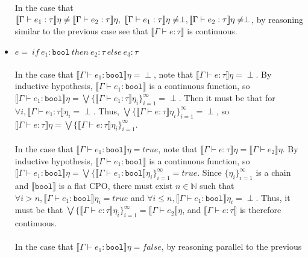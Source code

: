 \documentclass{westhesis}
\begin{document}
\begin{itemize}
 In the case that $\llbracket \Gamma \vdash e_1 : \tau \rrbracket\eta \neq \llbracket \Gamma \vdash e_2 : \tau\rrbracket\eta, \ \llbracket \Gamma \vdash e_1 : \tau \rrbracket\eta \neq \perp, \\ \llbracket \Gamma \vdash e_2 : \tau \rrbracket\eta \neq \perp$, by reasoning similar to the previous case see that $\llbracket \Gamma \vdash e : \tau \rrbracket$ is continuous.
 \item $e = \ if \ e_1 : \texttt{bool} \ then \ e_2 : \tau \ else \ e_3 : \tau$ \\ \\
In the case that $\llbracket \Gamma \vdash e_1 : \texttt{bool} \rrbracket\eta = \perp$, note that $\llbracket \Gamma \vdash e : 
\tau \rrbracket\eta =  \perp$. By inductive hypothesis, $\llbracket \Gamma \vdash e_1 : \texttt{bool} \rrbracket$ is a 
continuous function, so $\llbracket \Gamma \vdash e_1 : \texttt{bool} \rrbracket\eta = \bigvee\{\llbracket \Gamma \vdash e_1 : 
\tau \rrbracket\eta_i\}^{\infty}_{i=1} = \perp$. Then it must be that for $\forall i, \llbracket \Gamma \vdash e_1 : \tau 
\rrbracket\eta_i = \perp$. Thus, $\bigvee\{\llbracket \Gamma \vdash e : \tau \rrbracket\eta_i\}^{\infty}_{i=1} = \perp$, so $
\llbracket \Gamma \vdash e : \tau \rrbracket\eta = \bigvee\{\llbracket \Gamma \vdash e : \tau \rrbracket\eta_i\}^{\infty}_{i=1}$. \\ \\
In the case that $\llbracket \Gamma \vdash e_1 : \texttt{bool} \rrbracket\eta = true$, note that $\llbracket \Gamma \vdash e : 
\tau \rrbracket\eta =  \llbracket \Gamma \vdash e_2 \rrbracket\eta$. By inductive hypothesis, $\llbracket \Gamma \vdash e_1 : 
\texttt{bool} \rrbracket$ is a continuous function, so $\llbracket \Gamma \vdash e_1 : \texttt{bool} \rrbracket\eta = \bigvee
\{\llbracket \Gamma \vdash e_1 : \texttt{bool} \rrbracket\eta_i\}^{\infty}_{i=1} = true$. Since $\{ \eta_i\}^{\infty}_{i=1}$ is a chain 
and $\llbracket\texttt{bool}\rrbracket$ is a flat CPO, there must exist $n \in \mathbb{N}$ such that $\forall i > n, \llbracket \Gamma \vdash e_1 : 
\texttt{bool}
\rrbracket\eta_i = true$ and $\forall i \leq n, \llbracket \Gamma \vdash e_1 : \texttt{bool}\rrbracket\eta_i = \perp$. Thus, it must 
be that $\bigvee\{\llbracket \Gamma \vdash e : \tau \rrbracket\eta_i\}^{\infty}_{i=1} = \llbracket \Gamma \vdash e_2 
\rrbracket\eta$, and $\llbracket \Gamma \vdash e : \tau \rrbracket$ is therefore continuous. \\ \\
In the case that $\llbracket \Gamma \vdash e_1 : \texttt{bool} \rrbracket\eta = false$, by reasoning parallel to the previous 

\end{itemize}
\end{document}
